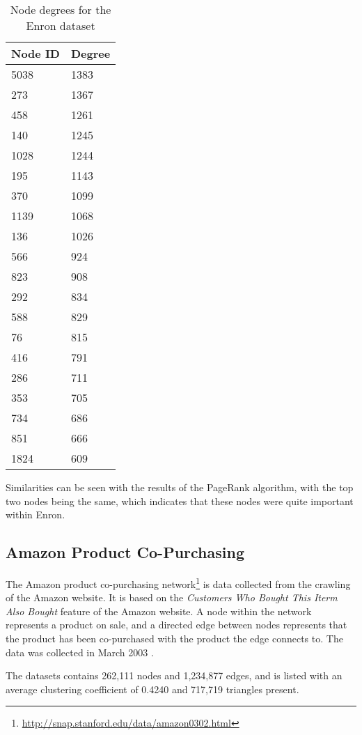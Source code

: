 \begin{table}[htbp]%
\centering
\begin{tabular}{|l|l|}
\hline
Node ID & Degree \\
\hline
5038 & 1383 \\
273 & 1367 \\
458 & 1261 \\
140 & 1245 \\
1028 & 1244 \\
195 & 1143 \\
370 & 1099 \\
1139 & 1068 \\
136 & 1026 \\
566 & 924 \\
823 & 908 \\
292 & 834 \\
588 & 829 \\
76 & 815 \\
416 & 791 \\
286 & 711 \\
353 & 705 \\
734 & 686 \\
851 & 666 \\
1824 & 609 \\
\hline
\end{tabular}
\caption{Node degrees for the Enron dataset}
\label{tab:enrondegree}
\end{table}

Similarities can be seen with the results of the PageRank algorithm, with the top two nodes being the same, which indicates that these nodes were quite important within Enron.

\subsection{Amazon Product Co-Purchasing}
The Amazon product co-purchasing network\footnote{\url{http://snap.stanford.edu/data/amazon0302.html}} is data collected from the crawling of the Amazon website. It is based on the \emph{Customers Who Bought This Iterm Also Bought} feature of the Amazon website. A node within the network represents a product on sale, and a directed edge between nodes represents that the product has been co-purchased with the product the edge connects to. The data was collected in March 2003 \cite{snap}.

The datasets contains 262,111 nodes and 1,234,877 edges, and is listed with an average clustering coefficient of 0.4240 and 717,719 triangles present.


